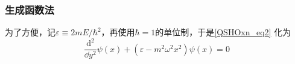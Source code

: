





\subsubsection{生成函数法}

为了方便，记$\varepsilon \equiv 2mE/\hbar^2$，再使用$\hbar=1$的单位制，于是\autoref{QSHOxn_eq2} 化为
\begin{equation}
\frac{\mathrm{d}^2}{\dd y^2}\psi(x) + (\varepsilon-m^2\omega^2x^2)\psi(x)=0
\end{equation}












